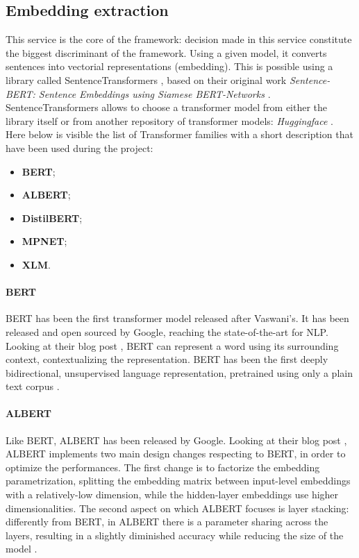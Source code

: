 \documentclass[\main/main.tex]{subfiles}
\begin{document}
\subsection{Embedding extraction}
This service is the core of the framework: decision made in this service constitute the biggest discriminant of the framework. Using a given model, it converts sentences into vectorial representations (embedding). This is possible using a library called SentenceTransformers \cite{sbert}, based on their original work \emph{Sentence-BERT: Sentence Embeddings using Siamese BERT-Networks} \cite{reimers2019sentencebert}. SentenceTransformers allows to choose a transformer model from either the library itself or from another repository of transformer models: \emph{Huggingface} \cite{huggingface}. Here below is visible the list of Transformer families with a short description that have been used during the project:
\begin{itemize}
    \item \textbf{BERT};
    \item \textbf{ALBERT};
    \item \textbf{DistilBERT};
    \item \textbf{MPNET};
    \item \textbf{XLM}.
\end{itemize} 
\paragraph{BERT}
BERT has been the first transformer model released after Vaswani's. It has been released and open sourced by Google, reaching the state-of-the-art for NLP. Looking at their blog post \cite{bert_blog_post}, BERT can represent a word using its surrounding context, contextualizing the representation. BERT has been the first deeply bidirectional, unsupervised language representation, pretrained using only a plain text corpus \cite{DBLP:journals/corr/abs-1810-04805}.
\paragraph{ALBERT}
Like BERT, ALBERT has been released by Google. Looking at their blog post \cite{albert_blog_post}, ALBERT implements two main design changes respecting to BERT, in order to optimize the performances. The first change is to factorize the embedding parametrization, splitting the embedding matrix between input-level embeddings with a relatively-low dimension, while the hidden-layer embeddings use higher dimensionalities. The second aspect on which ALBERT focuses is layer stacking: differently from BERT, in ALBERT there is a parameter sharing across the layers, resulting in a slightly diminished accuracy while reducing the size of the model \cite{DBLP:journals/corr/abs-1909-11942}.
\end{document}
